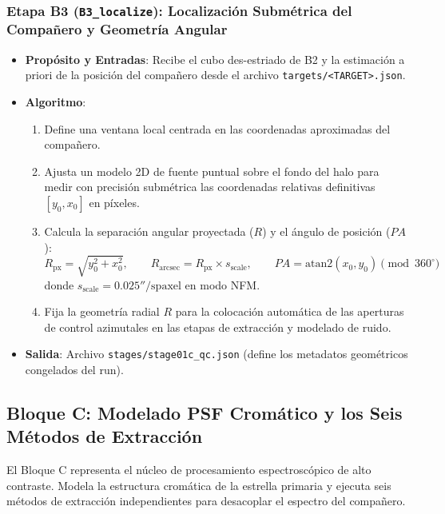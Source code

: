 \documentclass[11pt,a4paper]{article}
\begin{document}
\subsubsection{Etapa B3 (\texttt{B3\_localize}): Localización Submétrica del Compañero y Geometría Angular}
\begin{itemize}[leftmargin=1.0cm]
    \item \textbf{Propósito y Entradas}: Recibe el cubo des-estriado de B2 y la estimación a priori de la posición del compañero desde el archivo \texttt{targets/<TARGET>.json}.
    \item \textbf{Algoritmo}:
    \begin{enumerate}
        \item Define una ventana local centrada en las coordenadas aproximadas del compañero.
        \item Ajusta un modelo 2D de fuente puntual sobre el fondo del halo para medir con precisión submétrica las coordenadas relativas definitivas $[y_0, x_0]$ en píxeles.
        \item Calcula la separación angular proyectada ($R$) y el ángulo de posición ($PA$):
        $$R_\text{px} = \sqrt{y_0^2 + x_0^2}, \qquad R_\text{arcsec} = R_\text{px} \times s_\text{scale}, \qquad PA = \text{atan2}(x_0, y_0) \pmod{360^\circ}$$
        donde $s_\text{scale} = 0.025''/\text{spaxel}$ en modo NFM.
        \item Fija la geometría radial $R$ para la colocación automática de las aperturas de control azimutales en las etapas de extracción y modelado de ruido.
    \end{enumerate}
    \item \textbf{Salida}: Archivo \texttt{stages/stage01c\_qc.json} (define los metadatos geométricos congelados del run).
\end{itemize}

\subsection{Bloque C: Modelado PSF Cromático y los Seis Métodos de Extracción}

El Bloque C representa el núcleo de procesamiento espectroscópico de alto contraste. Modela la estructura cromática de la estrella primaria y ejecuta seis métodos de extracción independientes para desacoplar el espectro del compañero.
\end{document}
